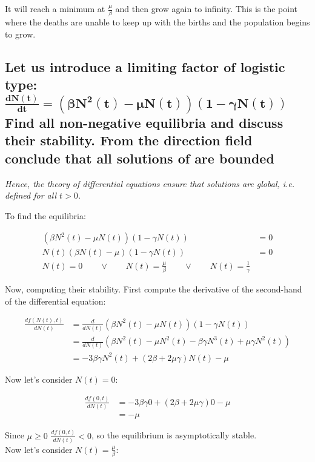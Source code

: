   It will reach a minimum at $\frac{\mu}{\beta}$ and then grow again to infinity.
  This is the point where the deaths are unable to keep up with the births and the population begins to grow.


  \subsection{Let us introduce a limiting factor of logistic type:\\ $\mathbf{\frac{dN(t)}{dt} = \left(\beta N^2(t) - \mu N(t)\right)(1-\gamma N(t))}$ Find all non-negative equilibria and discuss their stability. From the direction field conclude that all solutions of are bounded}
  \textit{Hence, the theory of differential equations ensure that solutions are global, i.e. defined for all $t > 0$.}


  To find the equilibria:

  \begin{align*}
    \left(\beta N^2(t) - \mu N(t)\right)(1-\gamma N(t)) &= 0\\
    N(t)\left(\beta N(t) - \mu\right)(1-\gamma N(t)) &= 0\\
    N(t) = 0 \qquad \lor\qquad N(t) = \frac{\mu}{\beta}\qquad\lor\qquad N(t) = \frac{1}{\gamma}
  \end{align*}

  Now, computing their stability.
  First compute the derivative of the second-hand of the differential equation:

  \begin{align*}
    \frac{df(N(t), t)}{dN(t)} &= \frac{d}{dN(t)}\left(\beta N^2(t) - \mu N(t)\right)(1-\gamma N(t))\\
                              &=\frac{d}{dN(t)}\left(\beta N^2(t)-\mu N^2(t)-\beta\gamma N^3(t)+\mu\gamma N^2(t)\right)\\
                              &=-3\beta\gamma N^2(t) + (2\beta + 2\mu\gamma)N(t) - \mu
  \end{align*}

  Now let's consider $N(t) = 0$:

  \begin{align*}
    \frac{df(0, t)}{dN(t)} &= -3\beta\gamma 0 + (2\beta + 2\mu\gamma)0 - \mu\\
                           &= -\mu
  \end{align*}

  Since $\mu\ge 0$ $\frac{df(0, t)}{dN(t)} <0$, so the equilibrium is asymptotically stable.\\
  Now let's consider $N(t) = \frac{\mu}{\beta}$:

